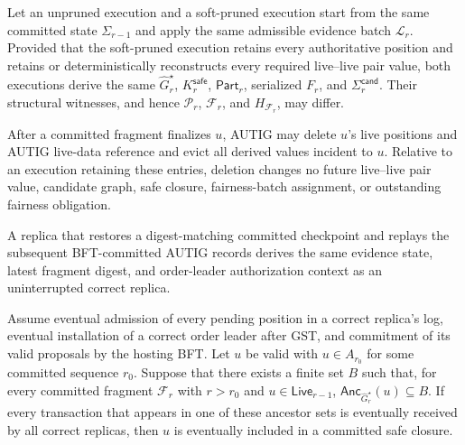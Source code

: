 \begin{theorem}
\label{thm:pruning_safety}
Let an unpruned execution and a soft-pruned execution start from the same
committed state $\Sigma_{r-1}$ and apply the same admissible evidence batch
$\mathcal L_r$.  Provided that the soft-pruned execution retains every
authoritative position and retains or deterministically reconstructs every
required live--live pair value, both executions derive the same
$\widehat G_r^\star$, $K_r^{\mathsf{safe}}$, $\mathsf{Part}_r$, serialized
$F_r$, and $\Sigma_r^{\mathsf{cand}}$.  Their structural witnesses, and hence
$\mathcal P_r$, $\mathcal F_r$, and $H_{\mathcal F_r}$, may differ.
\end{theorem}

\begin{theorem}
\label{thm:hard-deletion}
After a committed fragment finalizes $u$, AUTIG may delete $u$'s live
positions and AUTIG live-data reference and evict all derived values incident
to $u$.  Relative to an execution retaining these entries, deletion changes
no future live--live pair value, candidate graph, safe closure, fairness-batch
assignment, or outstanding fairness obligation.
\end{theorem}

\begin{theorem}
\label{thm:recovery}
A replica that restores a digest-matching committed checkpoint and replays the
subsequent BFT-committed AUTIG records derives the same evidence state, latest
fragment digest, and order-leader authorization context as an uninterrupted
correct replica.
\end{theorem}

\begin{proposition}
\label{prop:stabilized-progress}
Assume eventual admission of every pending position in a correct replica's
log, eventual installation of a correct order leader after GST, and commitment
of its valid proposals by the hosting BFT.  Let $u$ be valid with
$u\in A_{r_0}$ for some committed sequence $r_0$.  Suppose that there exists a
finite set $B$ such that, for every committed fragment $\mathcal F_r$ with
$r>r_0$ and $u\in\mathsf{Live}_{r-1}$,
$\mathsf{Anc}_{\widehat G_r^\star}(u)\subseteq B$.  If every transaction that
appears in one of these ancestor sets is eventually received by all correct
replicas, then $u$ is eventually included in a committed safe closure.
\end{proposition}

